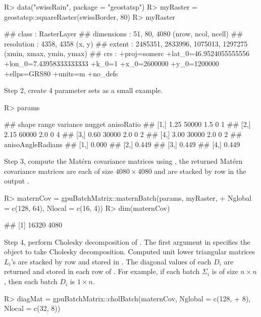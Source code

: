 \documentclass[article,nojss]{jss}\usepackage[]{graphicx}\usepackage[]{color}
\newcommand{\fct}[1]{\code{#1()}}
\begin{document}
\begin{CodeChunk}
\begin{CodeInput}
R> data("swissRain", package = "geostatsp")
R> myRaster = geostatsp::squareRaster(swissBorder, 80)
R> myRaster
\end{CodeInput}
\begin{CodeOutput}
## class      : RasterLayer 
## dimensions : 51, 80, 4080  (nrow, ncol, ncell)
## resolution : 4358, 4358  (x, y)
## extent     : 2485351, 2833996, 1075013, 1297275  (xmin, xmax, ymin, ymax)
## crs        : +proj=somerc +lat_0=46.9524055555556 +lon_0=7.43958333333333 +k_0=1 +x_0=2600000 +y_0=1200000 +ellps=GRS80 +units=m +no_defs
\end{CodeOutput} 
\end{CodeChunk} 

Step 2, create 4 parameter sets as a small example. 

\begin{CodeChunk}
\begin{CodeInput}
R> params
\end{CodeInput}
\begin{CodeOutput}
##      shape range variance nugget anisoRatio
## [1,]  1.25 50000      1.5      0          1
## [2,]  2.15 60000      2.0      0          4
## [3,]  0.60 30000      2.0      0          2
## [4,]  3.00 30000      2.0      0          2
##      anisoAngleRadians
## [1,]             0.000
## [2,]             0.449
## [3,]             0.449
## [4,]             0.449
\end{CodeOutput} 
\end{CodeChunk} 

Step 3, compute the Mat\'ern covariance matrices using \fct{gpuBatchMatrix::maternBatch}, the returned Mat\'ern covariance matrices %
are each of size $4080 \times 4080$ and are stacked by row in the output . 
\begin{CodeChunk}
\begin{CodeInput}
R> maternCov = gpuBatchMatrix::maternBatch(params, myRaster,
+    Nglobal = c(128, 64), Nlocal = c(16, 4))
R> dim(maternCov)
\end{CodeInput}
\begin{CodeOutput}
## [1] 16320  4080
\end{CodeOutput} 
\end{CodeChunk} 

Step 4, perform Cholesky decomposition of . The first argument in \fct{cholBatch} specifies the object to take Cholesky decomposition. Computed unit lower triangular matrices $L_i$'s are stacked by row and stored in . The diagonal values of each $D_i$ are returned and stored in each row of . For example, if each batch $\Sigma_i$ is of size $n \times n$, then each batch $D_i$ is $1 \times n$.
\begin{CodeChunk}
\begin{CodeInput}
R> diagMat = gpuBatchMatrix::cholBatch(maternCov, Nglobal = c(128,
+    8), Nlocal = c(32, 8))
\end{CodeInput} 
\end{CodeChunk} 
\end{document}
